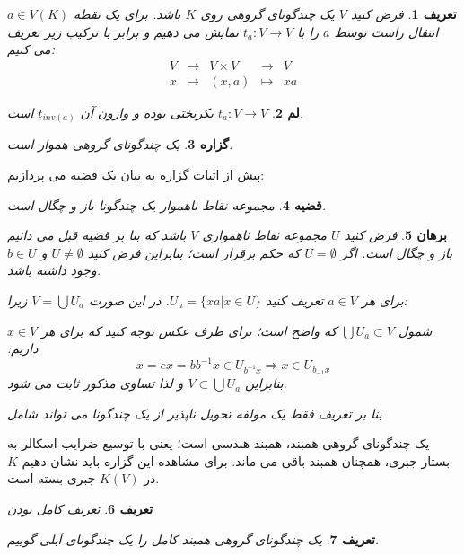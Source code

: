 \documentclass[12pt]{report}
\newtheorem{thm}{قضیه}[chapter]
\newtheorem{defn}[thm]{تعریف}
\newtheorem{prop}[thm]{گزاره}
\newtheorem{lmm}[thm]{لم}
\newtheorem{prf}[thm]{برهان}
\begin{document}
	 \begin{defn}
	 	فرض کنید
	 	$V$
	 	یک چندگونای گروهی روی 
	 	$K$
	 	باشد. برای یک نقطه 
	 	$a\in V(K)$
	 	انتقال راست توسط $a$ را با 
	 	$t_a:V\rightarrow V$
	 	نمایش می دهیم و برابر با ترکیب زیر تعریف می کنیم:
	 	\begin{equation*}
	 		\begin{aligned}
	 			V &\rightarrow &V\times V &\rightarrow &V\\
	 			x &\mapsto &(x,a) &\mapsto &xa
	 		\end{aligned}
	 	\end{equation*}
	 \end{defn}
	 \begin{lmm}
	 	$t_a:V\rightarrow V$
	 	یکریختی بوده و وارون آن 
	 	$t_{inv(a)}$
	 	است.
	 \end{lmm}
	 \begin{prop}
	 	یک چندگونای گروهی هموار است. 
	 \end{prop}
	 پیش از اثبات گزاره به بیان یک قضیه می پردازیم:
	 \begin{thm}
	 	مجموعه نقاط ناهموار یک چندگونا باز و چگال است.
	 \end{thm}
	 \begin{prf}
	 	فرض کنید 
	 	$U$
	 	مجموعه نقاط ناهمواری 
	 	$V$
	 	باشد که بنا بر قضیه قبل می دانیم باز و چگال است. اگر 
	 	$U=\emptyset$
	 	که حکم برقرار است؛ بنابراین فرض کنید
	 	$U\neq\emptyset$
	 	و
	 	$b\in U$
	 	وجود داشته باشد.
	 	
	 	برای هر 
	 	$a\in V$
	 	تعریف کنید
	 	$ U_a=\{xa|x\in U\}$. 
	 	در این صورت 
	 	$V=\bigcup U_a$
	 	زیرا: 
	 	
	 	شمول
	 	$\bigcup U_a\subset V$
	 	که واضح است؛ برای طرف عکس توجه کنید که برای هر 
	 	$x\in V$
	 	داریم:
	 	$$x = ex = bb^{-1}x \in U_{b^{-1}x} \Rightarrow x\in U_{b_{-1}x}$$
	 	بنابراین 
	 	$V\subset \bigcup U_a$
	 	و لذا تساوی مذکور ثابت می شود.
	 	
	 	بنا بر تعریف فقط یک مولفه تحویل ناپذیر از یک چندگونا می تواند شامل 
	 \end{prf}
	 
	 یک چندگونای گروهی همبند، همبند هندسی
	 است؛ یعنی با توسیع ضرایب اسکالر به بستار جبری، همچنان همبند باقی می ماند. برای مشاهده این گزاره باید نشان دهیم 
	 $K$
	 در 
	 $K(V)$
	 جبری-بسته است.
	 \begin{defn}
	 	تعریف کامل بودن
	 \end{defn}
	 \begin{defn}
	 	یک چندگونای گروهی همبند کامل را یک چندگونای آبلی گوییم.
	 \end{defn}
	 
\end{document}
